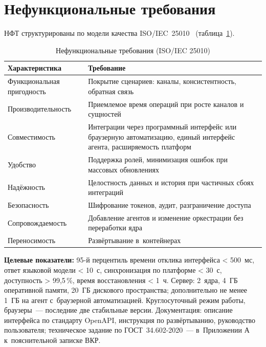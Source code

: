
\section{Нефункциональные требования}
\label{sec:nonfunctional}

НФТ структурированы по модели качества ISO/IEC~25010~\cite{src:9, src:10} (таблица~\ref{tab:nfr}).

\begin{table}[H]
  \caption{Нефункциональные требования (ISO/IEC 25010)}
  \label{tab:nfr}
  \small
  \begin{tabularx}{\textwidth}{|p{3.8cm}|X|}
    \hline
    \textbf{Характеристика} & \textbf{Требование} \\
    \hline
    Функциональная пригодность & Покрытие сценариев: каналы, консистентность, обратная связь \\
    \hline
    Производительность & Приемлемое время операций при росте каналов и сущностей \\
    \hline
    Совместимость & Интеграции через программный интерфейс или браузерную автоматизацию, единый интерфейс агента, расширяемость платформ \\
    \hline
    Удобство & Поддержка ролей, минимизация ошибок при массовых обновлениях \\
    \hline
    Надёжность & Целостность данных и история при частичных сбоях интеграций \\
    \hline
    Безопасность & Шифрование токенов, аудит, разграничение доступа \\
    \hline
    Сопровождаемость & Добавление агентов и изменение оркестрации без переработки ядра \\
    \hline
    Переносимость & Развёртывание в~контейнерах \\
    \hline
  \end{tabularx}
\end{table}

\textbf{Целевые показатели:} 95-й перцентиль времени отклика интерфейса < 500~мс, ответ языковой модели < 10~с, синхронизация по платформе < 30~с, доступность > 99{,}5\,\%, время восстановления < 1~ч. Сервер: 2~ядра, 4~ГБ оперативной памяти, 20~ГБ дискового пространства; дополнительно не менее 1~ГБ на агент с~браузерной автоматизацией. Круглосуточный режим работы, браузеры~--- последние две стабильные версии. Документация: описание интерфейса по стандарту OpenAPI, инструкция по развёртыванию, руководство пользователя; техническое задание по ГОСТ~34.602-2020~--- в~Приложении А к~пояснительной записке ВКР.
